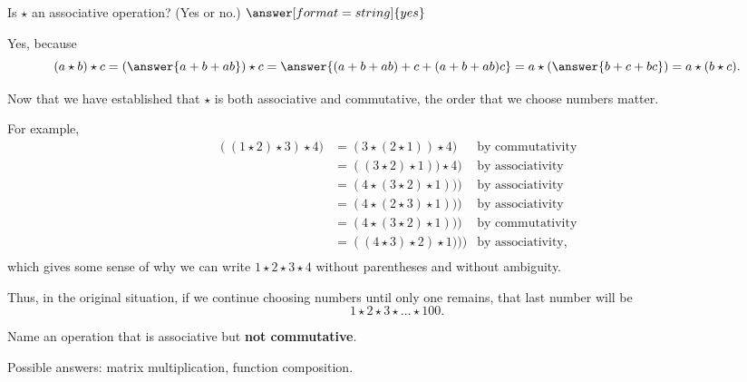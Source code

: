 \documentclass{ximera}
\begin{document}
\begin{problem}
Is $\star$ an associative operation?  (Yes or no.)  $\answer[format=string]{yes}$

\begin{explanation}
Yes, because 
\[
(a\star b)\star c =  \left(\answer{a+b+ab}\right)\star c = \answer{(a+b+ab)+c + (a+b+ab)c} 
 = a\star \left(\answer{b+c+bc}\right) = a \star(b\star c). 
 \]
\begin{question}
Now that we have established that $\star$ is both associative 
and commutative, the order that we choose numbers  matter.  

For example, 
\begin{align*}
((1\star 2)\star 3 )\star 4) &= (3\star (2\star 1))\star 4) &  \text{by commutativity} \\
                                        &= ((3\star 2)\star 1))\star 4) & \text{by associativity}  \\
                                        &= (4\star (3\star 2)\star 1))) & \text{by associativity}  \\
                                        &= (4\star (2\star 3)\star 1))) & \text{by associativity}  \\
                                        &= (4\star (3\star 2)\star 1))) & \text{by commutativity}  \\
                                        &= ((4\star 3)\star 2)\star 1))) & \text{by associativity},  \\
\end{align*}
which gives some sense of why we can write $1\star 2 \star 3 \star 4$ without parentheses and without ambiguity.  

Thus, in the original situation, if we continue choosing numbers until only one remains, that last number will be 
\[
1\star 2\star 3\star \dots \star 100. 
\]
\end{question}
\end{explanation}
\end{problem}

\begin{problem}
Name an operation that is associative but \textbf{not commutative}.  
\begin{freeResponse}
\begin{hint}
Possible answers: matrix multiplication, function composition.  
\end{hint}
\end{freeResponse}
\end{problem}
\end{document}
